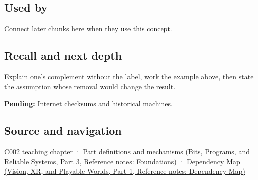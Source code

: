 \subsection{Used by}\label{appendix-03c678cd40b3-used-by}

\hypertarget{appendix-03c678cd40b3-used-by}{}

Connect later chunks here when they use this concept.

\subsection{Recall and next depth}\label{appendix-03c678cd40b3-recall-and-next-depth}

\hypertarget{appendix-03c678cd40b3-recall-and-next-depth}{}

Explain one's complement without the label, work the example above, then state the assumption whose removal would change the result.

\textbf{Pending:} Internet checksums and historical machines.

\subsection{Source and navigation}\label{appendix-03c678cd40b3-source-and-navigation}

\hypertarget{appendix-03c678cd40b3-source-and-navigation}{}

\hyperref[01-foundations-i-ch001-arithmetic-becomes-a-policy]{C002 teaching chapter} · \href{../01-Bits-Programs-and-Reliable-Systems-P03/main.pdf\#appendix-fd090d982a15}{Part definitions and mechanisms (Bits, Programs, and Reliable Systems, Part 3, Reference notes: Foundations)} · \href{../07-Vision-XR-and-Playable-Worlds-P01/main.pdf\#appendix-4ad47bdd269a}{Dependency Map (Vision, XR, and Playable Worlds, Part 1, Reference notes: Dependency Map)}
